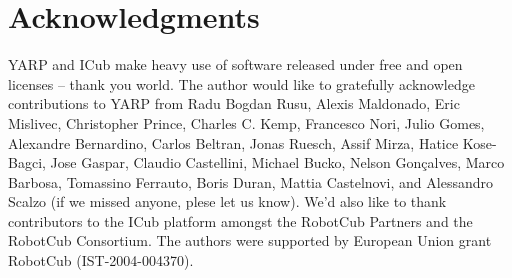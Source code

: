 
\section{Acknowledgments}

YARP and ICub make heavy use of software released under free and open
licenses -- thank you world.
%
The author would like to gratefully acknowledge contributions to YARP
from Radu Bogdan Rusu, Alexis Maldonado, Eric Mislivec, Christopher
Prince, Charles C. Kemp, Francesco Nori, Julio Gomes, Alexandre
Bernardino, Carlos Beltran, Jonas Ruesch, Assif Mirza, Hatice
Kose-Bagci, Jose Gaspar, Claudio Castellini, Michael Bucko, Nelson
Gon\c calves, Marco Barbosa, Tomassino Ferrauto, Boris Duran, Mattia
Castelnovi, and Alessandro Scalzo (if we missed anyone, plese let us
know).  We'd also like to thank contributors to the ICub platform
amongst the RobotCub Partners and the RobotCub Consortium.
%
The authors were supported by European Union
grant RobotCub (IST-2004-004370).




